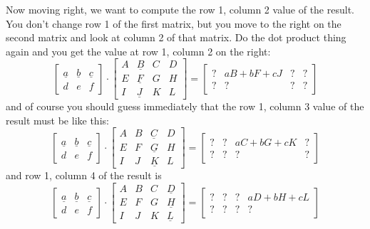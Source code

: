 Now moving right, we want to compute the row 1, column 2 value
of the result. You don't change row 1 of the first matrix,
but you move to the right on the second matrix and look at column 2
of that matrix. Do the dot product thing again and you get the
value at row 1, column 2 on the right:
\[
\begin{bmatrix}
\underline{a} & \underline{b} & \underline{c} \\
d & e & f 
\end{bmatrix}
\cdot
\begin{bmatrix}
A & \underline{B} & C & D \\
E & \underline{F} & G & H \\
I & \underline{J} & K & L  
\end{bmatrix}
= 
\begin{bmatrix}
? & aB + bF + cJ & ? & ? \\
? & ? & ? & ?
\end{bmatrix}
\]
and of course you should guess immediately that the row 1, column 3
value of the result must be like this:
\[
\begin{bmatrix}
\underline{a} & \underline{b} & \underline{c} \\
d & e & f 
\end{bmatrix}
\cdot
\begin{bmatrix}
A & B & \underline{C} & D \\
E & F & \underline{G} & H \\
I & J & \underline{K} & L  
\end{bmatrix}
= 
\begin{bmatrix}
? & ? & aC + bG + cK & ? \\
? & ? & ? & ?
\end{bmatrix}
\]
and row 1, column 4 of the result is
\[
\begin{bmatrix}
\underline{a} & \underline{b} & \underline{c} \\
d & e & f 
\end{bmatrix}
\cdot
\begin{bmatrix}
A & B & C & \underline{D} \\
E & F & G & \underline{H} \\
I & J & K & \underline{L}  
\end{bmatrix}
= 
\begin{bmatrix}
? & ? & ? & aD + bH + cL \\
? & ? & ? & ?
\end{bmatrix}
\]

